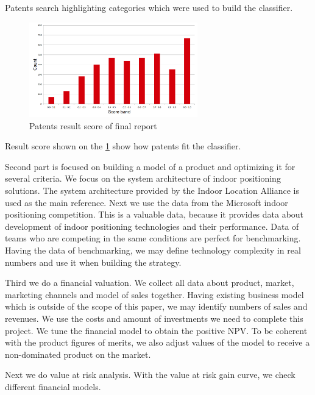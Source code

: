 Patents search highlighting categories which were used to build the classifier.

\begin{figure}[ht]
	\centering
	\includegraphics[width=0.65\textwidth]{graphics/roadmap/patents/score.png}
	\caption{Patents result score of final report}
	\label{fig:Patent-score}
\end{figure}

Result score shown on the \ref{fig:Patent-score} show how patents fit the classifier.


Second part is focused on building a model of a product and optimizing it for several criteria.
We focus on the system architecture of indoor positioning solutions. The system architecture provided by the Indoor Location Alliance is used as the main reference. Next we use the data from the Microsoft indoor positioning competition. This is a valuable data, because it provides data about development of indoor positioning technologies and their performance. Data of teams who are competing in the same conditions are perfect for benchmarking. Having the data of benchmarking, we may define technology complexity in real numbers and use it when building the strategy.

Third we do a financial valuation. We collect all data about product, market, marketing channels and model of sales together.
Having existing business model which is outside of the scope of this paper, we may identify numbers of sales and revenues.
We use the costs and amount of investments we need to complete this project.
We tune the financial model to obtain the positive NPV. To be coherent with the product figures of merits, we also adjust values of the model to receive a non-dominated product on the market.

Next we do value at risk analysis. With the value at risk gain curve, we check different financial models.

